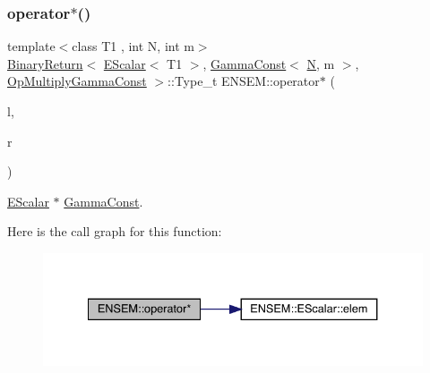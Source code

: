 \subsubsection{\texorpdfstring{operator$\ast$()}{operator*()}\hspace{0.1cm}{\footnotesize\ttfamily [3/9]}}
{\footnotesize\ttfamily template$<$class T1 , int N, int m$>$ \\
\mbox{\hyperlink{structENSEM_1_1BinaryReturn}{Binary\+Return}}$<$ \mbox{\hyperlink{classENSEM_1_1EScalar}{E\+Scalar}}$<$ T1 $>$, \mbox{\hyperlink{classENSEM_1_1GammaConst}{Gamma\+Const}}$<$ \mbox{\hyperlink{operator__name__util_8cc_a7722c8ecbb62d99aee7ce68b1752f337}{N}}, m $>$, \mbox{\hyperlink{structENSEM_1_1OpMultiplyGammaConst}{Op\+Multiply\+Gamma\+Const}} $>$\+::Type\+\_\+t E\+N\+S\+E\+M\+::operator$\ast$ (\begin{DoxyParamCaption}\item[{const \mbox{\hyperlink{classENSEM_1_1EScalar}{E\+Scalar}}$<$ T1 $>$ \&}]{l,  }\item[{const \mbox{\hyperlink{classENSEM_1_1GammaConst}{Gamma\+Const}}$<$ \mbox{\hyperlink{operator__name__util_8cc_a7722c8ecbb62d99aee7ce68b1752f337}{N}}, m $>$ \&}]{r }\end{DoxyParamCaption})\hspace{0.3cm}{\ttfamily [inline]}}



\mbox{\hyperlink{classENSEM_1_1EScalar}{E\+Scalar}} $\ast$ \mbox{\hyperlink{classENSEM_1_1GammaConst}{Gamma\+Const}}. 

Here is the call graph for this function\+:
\nopagebreak
\begin{figure}[H]
\begin{center}
\leavevmode
\includegraphics[width=334pt]{d4/dca/group__escalar_ga10de70ea3b5491035fab4f67de013321_cgraph}
\end{center}
\end{figure}
\mbox{\label{group__escalar_ga53bf11728d0f1f7fb9dea51cd221792d}} 
